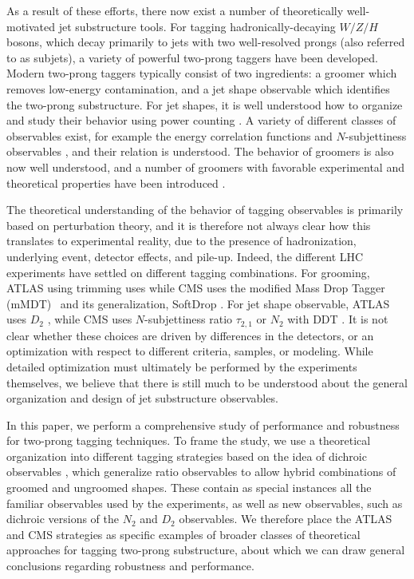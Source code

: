 \documentclass[11pt]{cernrep}
\begin{document}
As a result of these efforts, there now exist a number of theoretically well-motivated jet substructure tools.
%
For tagging hadronically-decaying $W/Z/H$ bosons, which decay primarily to jets with two well-resolved prongs (also referred to as subjets), a variety of powerful two-prong taggers have been developed.
%
Modern two-prong taggers typically consist of two ingredients: a groomer which removes low-energy contamination, and a jet shape observable which identifies the two-prong substructure.
%
For jet shapes, it is well understood how to organize and study their
behavior using power counting \cite{Larkoski:2014gra}.
%
A variety of
different classes of observables exist, for example the energy
correlation functions \cite{Larkoski:2013eya,Moult:2016cvt,Komiske:2017aww} and $N$-subjettiness
observables \cite{Thaler:2010tr,Thaler:2011gf}, and their relation is
understood.
%
The behavior of groomers is also now well understood, and
a number of groomers with favorable experimental and theoretical properties have been introduced
\cite{Dasgupta:2013ihk,Larkoski:2014wba}.

The
theoretical understanding of the behavior of tagging observables is primarily based on perturbation theory, and it is therefore
not always clear how this translates to experimental reality, due to
the presence of hadronization, underlying event, detector effects, and
pile-up.
%
Indeed, the different LHC experiments have settled on different
tagging combinations.
%
For grooming, ATLAS using trimming \cite{Krohn:2009th} uses while CMS uses the modified
  Mass Drop Tagger (mMDT)~\cite{Dasgupta:2013ihk} and its generalization, SoftDrop \cite{Larkoski:2014wba}.
  For jet shape observable, ATLAS uses $D_2$ \cite{Larkoski:2014gra,Larkoski:2015kga}, while CMS uses $N$-subjettiness ratio $\tau_{2,1}$ \cite{Thaler:2010tr,Thaler:2011gf} or $N_2$ \cite{Moult:2016cvt} with DDT \cite{Dolen:2016kst}.
  It is not clear whether these choices are driven by differences in the detectors, or an optimization with respect to different criteria, samples, or modeling. While detailed optimization must ultimately be performed by the experiments themselves, we believe that there is still much to be understood about the general organization and design of jet substructure observables.

In this paper, we perform a comprehensive study of performance and robustness for two-prong tagging techniques.
%
To frame the study, we use a theoretical organization into different tagging strategies based on the idea of dichroic observables \cite{Salam:2016yht}, which generalize ratio observables to allow hybrid combinations of groomed and ungroomed shapes.
 These contain as special instances all the familiar observables used by the experiments, as well as new observables, such as dichroic versions of the $N_2$ and $D_2$ observables.
 We therefore place the ATLAS and CMS strategies as specific examples of broader classes of theoretical approaches for tagging two-prong substructure, about which we can draw general conclusions regarding robustness and performance.
\end{document}
